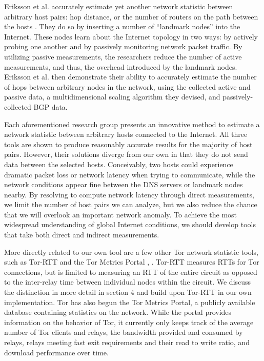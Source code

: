 \documentclass[twocolumn,11pt]{article}
\begin{document}
Eriksson et al. accurately estimate yet another network statistic between arbitrary host pairs: hop distance, or the number of routers on the path between the hosts \cite{Eriksson}. They do so by inserting a number of ``landmark nodes'' into the Internet. These nodes learn about the Internet topology in two ways: by actively probing one another and by passively monitoring network packet traffic. By utilizing passive measurements, the researchers reduce the number of active measurements, and thus, the overhead introduced by the landmark nodes. Eriksson et al. then demonstrate their ability to accurately estimate the number of hops between arbitrary nodes in the network, using the collected active and passive data, a multidimensional scaling algorithm they devised, and passively-collected BGP data.

Each aforementioned research group presents an innovative method to estimate a network statistic between arbitrary hosts connected to the Internet. All three tools are shown to produce reasonably accurate results for the majority of host pairs. However, their solutions diverge from our own in that they do not send data between the selected hosts. Conceivably, two hosts could experience dramatic packet loss or network latency when trying to communicate, while the network conditions appear fine between the DNS servers or landmark nodes nearby. By resolving to compute network latency through direct measurements, we limit the number of host pairs we can analyze, but we also reduce the chance that we will overlook an important network anomaly. To achieve the most widespread understanding of global Internet conditions, we should develop tools that take both direct and indirect measurements.

More directly related to our own tool are a few other Tor network statistic tools, such as Tor-RTT and the Tor Metrics Portal \cite{Tor_RTT}, \cite{Tor_Metrics_Portal}. Tor-RTT measures RTTs for Tor connections, but is limited to measuring an RTT of the entire circuit as opposed to the inter-relay time between individual nodes within the circuit. We discuss the distinction in more detail in section 4 and build upon Tor-RTT in our own implementation.  Tor has also begun the Tor Metrics Portal, a publicly available database containing statistics on the network.  While the portal provides information on the behavior of Tor, it currently only keeps track of the average number of Tor clients and relays,  the bandwidth provided and consumed by relays, relays meeting fast exit requirements and their read to write ratio, and download performance over time.
\end{document}
